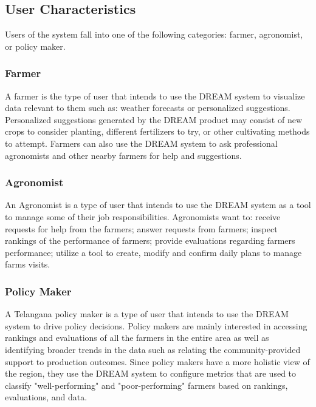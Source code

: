 \subsection{User Characteristics}
\begin{flushleft}
Users of the system fall into one of the following categories: farmer, agronomist, or policy maker.
\subsubsection{Farmer}
A farmer is the type of user that intends to use the DREAM system to visualize data relevant to them such as: weather forecasts or personalized suggestions. Personalized suggestions generated by the DREAM product may consist of new crops to consider planting, different fertilizers to try, or other cultivating methods to attempt. Farmers can also use the DREAM system to ask professional agronomists and other nearby farmers for help and suggestions.\\
\subsubsection{Agronomist}
An Agronomist is a type of user that intends to use the DREAM system as a tool to manage some of their job responsibilities. Agronomists want to: receive requests for help from the farmers; answer requests from farmers; inspect rankings of the performance of farmers; provide evaluations regarding farmers performance; utilize a tool to create, modify and confirm daily plans to manage farms visits.
\subsubsection{Policy Maker}
A Telangana policy maker is a type of user that intends to use the DREAM system to drive policy decisions. Policy makers are mainly interested in accessing rankings and evaluations of all the farmers in the entire area as well as identifying broader trends in the data such as relating the community-provided support to production outcomes. Since policy makers have a more holistic view of the region, they use the DREAM system to configure metrics that are used to classify "well-performing" and "poor-performing" farmers based on rankings, evaluations, and data.\\
\end{flushleft}




